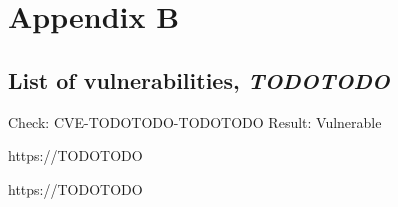 %
%
%
\clearpage

\chapter{Appendix B}
\label{appendix:AppendixB}

\section{List of vulnerabilities, \emph{TODOTODO}}
\label{appendix:APP_Vuln}

Check: CVE-TODOTODO-TODOTODO Result: Vulnerable\par
	https://TODOTODO\par
	https://TODOTODO\par
